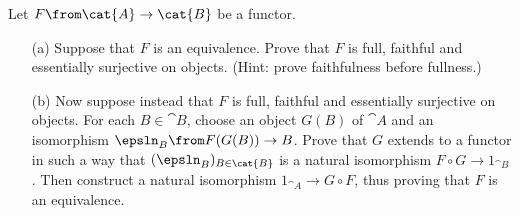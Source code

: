 \begin{exercise}
Let $F\from \cat{A} \to \cat{B}$ be a functor.

        \begin{itemize}
        \item[(a)]
Suppose that $F$ is an equivalence.  Prove that $F$ is full, faithful and
essentially surjective on objects.  (Hint: prove faithfulness before
fullness.)

        \item[(b)]
Now suppose instead that $F$ is full, faithful and essentially surjective
on objects.  For each $B \in \cat{B}$, choose an object $G(B)$ of $\cat{A}$
and an isomorphism $\epsln_B\from F(G(B)) \to B$.  Prove that $G$ extends
to a functor in such a way that $(\epsln_B)_{B \in \cat{B}}$ is a natural
isomorphism $F \circ G \to 1_{\cat{B}}$.  Then construct a natural isomorphism
$1_{\cat{A}} \to G \circ F$, thus proving that $F$ is an equivalence.
        \end{itemize}
\end{exercise}
